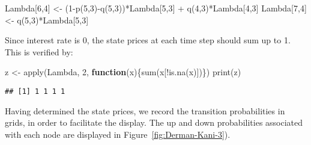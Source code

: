 \documentclass[]{tufte-book}
\newenvironment{Shaded}{}{}
\newcommand{\ControlFlowTok}[1]{\textcolor[rgb]{0.00,0.44,0.13}{\textbf{#1}}}
\newcommand{\DecValTok}[1]{\textcolor[rgb]{0.25,0.63,0.44}{#1}}
\newcommand{\FunctionTok}[1]{\textcolor[rgb]{0.02,0.16,0.49}{#1}}
\newcommand{\NormalTok}[1]{#1}
\newcommand{\OtherTok}[1]{\textcolor[rgb]{0.00,0.44,0.13}{#1}}
\newcommand{\SpecialCharTok}[1]{\textcolor[rgb]{0.25,0.44,0.63}{#1}}
\begin{document}
\begin{Shaded}
\begin{Highlighting}[]
\NormalTok{  Lambda[}\DecValTok{6}\NormalTok{,}\DecValTok{4}\NormalTok{] }\OtherTok{\textless{}{-}}\NormalTok{ (}\DecValTok{1}\SpecialCharTok{{-}}\FunctionTok{p}\NormalTok{(}\DecValTok{5}\NormalTok{,}\DecValTok{3}\NormalTok{)}\SpecialCharTok{{-}}\FunctionTok{q}\NormalTok{(}\DecValTok{5}\NormalTok{,}\DecValTok{3}\NormalTok{))}\SpecialCharTok{*}\NormalTok{Lambda[}\DecValTok{5}\NormalTok{,}\DecValTok{3}\NormalTok{] }\SpecialCharTok{+} \FunctionTok{q}\NormalTok{(}\DecValTok{4}\NormalTok{,}\DecValTok{3}\NormalTok{)}\SpecialCharTok{*}\NormalTok{Lambda[}\DecValTok{4}\NormalTok{,}\DecValTok{3}\NormalTok{]}
\NormalTok{  Lambda[}\DecValTok{7}\NormalTok{,}\DecValTok{4}\NormalTok{] }\OtherTok{\textless{}{-}} \FunctionTok{q}\NormalTok{(}\DecValTok{5}\NormalTok{,}\DecValTok{3}\NormalTok{)}\SpecialCharTok{*}\NormalTok{Lambda[}\DecValTok{5}\NormalTok{,}\DecValTok{3}\NormalTok{]}
\end{Highlighting}
\end{Shaded}

Since interest rate is 0, the state prices at each time step should sum
up to 1. This is verified by:

\begin{Shaded}
\begin{Highlighting}[]
\NormalTok{  z }\OtherTok{\textless{}{-}} \FunctionTok{apply}\NormalTok{(Lambda, }\DecValTok{2}\NormalTok{, }\ControlFlowTok{function}\NormalTok{(x)\{}\FunctionTok{sum}\NormalTok{(x[}\SpecialCharTok{!}\FunctionTok{is.na}\NormalTok{(x)])\})}
  \FunctionTok{print}\NormalTok{(z)}
\end{Highlighting}
\end{Shaded}

\begin{verbatim}
## [1] 1 1 1 1
\end{verbatim}

Having determined the state prices, we record the transition
probabilities in grids, in order to facilitate the display. The up and
down probabilities associated with each node are displayed in
Figure~\ref{fig:Derman-Kani-3}).
\end{document}
